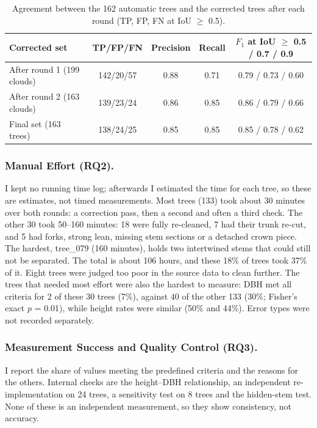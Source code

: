 \documentclass[runningheads]{llncs}
\begin{document}
\begin{table}[!tb]
\caption{Agreement between the 162 automatic trees and the corrected trees after each round (TP, FP, FN at IoU $\ge$ 0.5).}\label{tab:rq1}
\centering\footnotesize
\begin{tabular}{@{}lcccc@{}}
\toprule
Corrected set & TP/FP/FN & Precision & Recall & $F_1$ at IoU $\ge$ 0.5 / 0.7 / 0.9\\
\midrule
After round 1 (199 clouds) & 142/20/57 & 0.88 & 0.71 & 0.79 / 0.73 / 0.60\\
After round 2 (163 clouds) & 139/23/24 & 0.86 & 0.85 & 0.86 / 0.79 / 0.66\\
Final set (163 trees) & 138/24/25 & 0.85 & 0.85 & 0.85 / 0.78 / 0.62\\
\bottomrule
\end{tabular}
\end{table}

\subsubsection{Manual Effort (RQ2).}
I kept no running time log; afterwards I estimated the time for each tree, so these are estimates, not timed measurements. Most trees (133) took about 30 minutes over both rounds: a correction pass, then a second and often a third check. The other 30 took 50--160 minutes: 18 were fully re-cleaned, 7 had their trunk re-cut, and 5 had forks, strong lean, missing stem sections or a detached crown piece. The hardest, tree\_079 (160 minutes), holds two intertwined stems that could still not be separated. The total is about 106 hours, and these 18\% of trees took 37\% of it. Eight trees were judged too poor in the source data to clean further. The trees that needed most effort were also the hardest to measure: DBH met all criteria for 2 of these 30 trees (7\%), against 40 of the other 133 (30\%; Fisher's exact $p$ = 0.01), while height rates were similar (50\% and 44\%). Error types were not recorded separately.

\subsubsection{Measurement Success and Quality Control (RQ3).}
I report the share of values meeting the predefined criteria and the reasons for the others. Internal checks are the height--DBH relationship, an independent re-implementation on 24 trees, a sensitivity test on 8 trees and the hidden-stem test. None of these is an independent measurement, so they show consistency, not accuracy.
\end{document}
